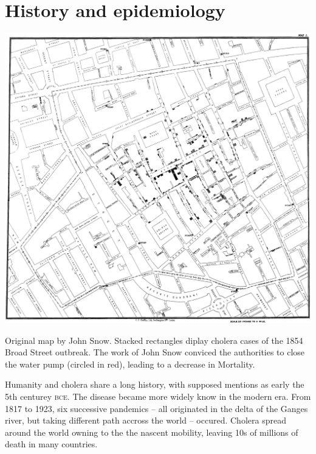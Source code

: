 \section{History and epidemiology}
\begin{marginfigure}[3\baselineskip]
\includegraphics[width=\textwidth]{fig/snow-cholera-map}
\caption[John Snow map of cluster cholera cases in London, 1854]{\footnotesize Original map by John Snow. Stacked rectangles diplay cholera cases of the 1854 Broad Street outbreak. The work of John Snow conviced the authorities to close the water pump (circled in red), leading to a decrease in Mortality.}\label{johnsnow}
\end{marginfigure}
Humanity and cholera share a long history, with supposed mentions as early the 5th centurey \textsc{bce}. The disease became more widely know in the modern era. From 1817 to 1923, six successive pandemics -- all originated in the delta of the Ganges river, but taking different path accross the world -- occured. Cholera spread around the world owning to the the nascent mobility, leaving 10s of millions of death in many countries. 
